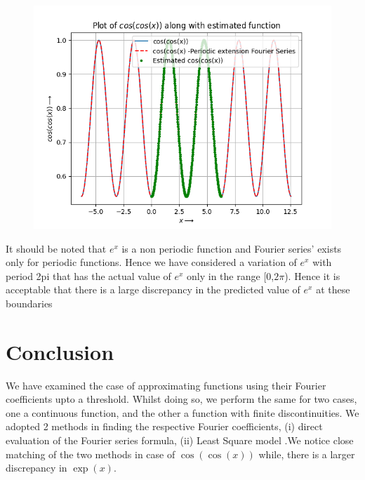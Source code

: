 \documentclass{article}
\begin{document}
\begin{figure}[h!]
    \centering
    \includegraphics[scale=0.7]{coscos_estim.png}
    \label{fig:1(b)}
\end{figure}

It should be noted that $e^x$ is a non periodic function and Fourier series' exists only for periodic functions. Hence we have considered a variation of $e^x$ with period 2pi that has the actual value of $e^x$ only in the range [0,$2\pi$). Hence it is acceptable that there is a large discrepancy in the predicted value of $e^x$ at these boundaries
\newline
\newline
\section{Conclusion}
We have examined the case of approximating functions using their Fourier
coefficients upto a threshold. Whilst doing so, we perform the
same for two cases, one a continuous function, and the other a function
with finite discontinuities.
\newline
\newline
We adopted 2 methods in finding the respective Fourier coefficients,\newline
(i) direct evaluation of the Fourier series formula, \newline (ii) Least Square model .\newline \newline We notice close matching of the two methods in
case of \(\cos(\cos(x))\) while, there is a larger discrepancy in \(\exp(x)\).
\end{document}
